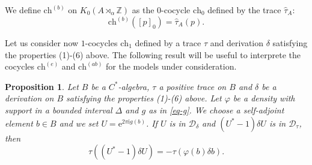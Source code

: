 \documentclass[11pt]{amsart}
\newtheorem{prop}{Proposition}[section]
\newcommand{\Z}{\mathbb{Z}}
\newcommand{\C}{\mathbb{C}}
\newcommand{\ch}{\text{ch}}
\newcommand{\chb}{\text{ch}^{(b)}}
\newcommand{\che}{\text{ch}^{(e)}}
\newcommand{\chab}{\text{ch}^{(ab)}}
\begin{document}
We define $\chb$ on $ K_0(A\rtimes_\alpha \Z)$ as the $0$-cocycle $\ch_0$ defined by the trace $\hat \tau_A$:
\begin{equation}\label{chern_bulk}
	\chb([p]_0)=\hat{\tau}_A(p).
\end{equation}

Let us consider now $1$-cocycles $\ch_1$ defined by a trace $\tau$ and derivation $\delta$ satisfying the properties (1)-(6) above. The following result will be useful to interprete the cocycles $\che$ and $\chab$  for the models under consideration. 
\begin{prop}\label{useful_formula_for_trace}
	Let $B$ be a $C^*$-algebra, $\tau$ a positive trace on $B$ and 
$\delta$ be a derivation on $B$ satisfying the properties (1)-(6) above. 
	Let $\varphi$ be a density with support in a bounded interval $\Delta$ and $g$ as in \eqref{eq-g}. We choose a self-adjoint element $b\in B$ and we set $U=\mathrm{e}^{2\pi\mathrm{i}g(b)}$. If $U$ is in $\mathcal{D}_\delta$ and $(U^*-1)\delta U$ is in $\mathcal{D}_\tau$, then
	$$\tau((U^*-1) \delta U)=-\tau(\varphi(b)\delta b).$$
	
	
	
	
\end{prop}
\end{document}
